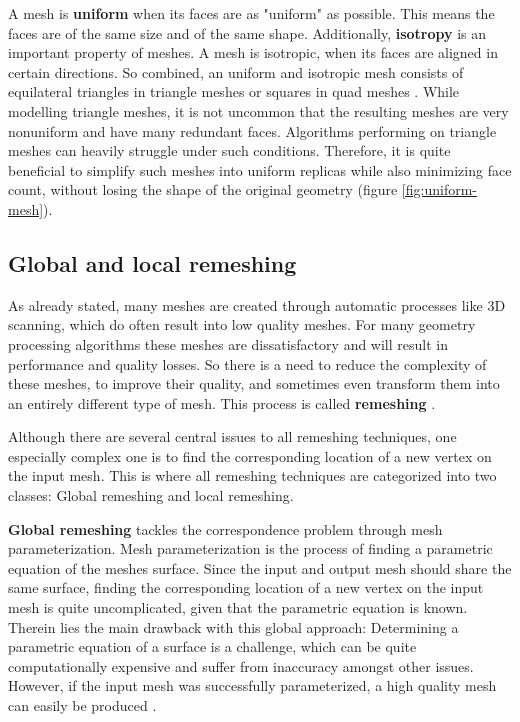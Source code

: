 \documentclass{ACGSeminar}
\begin{document}
A mesh is \textbf{uniform} when its faces are as "uniform" as possible. This means the faces are of the same size and of the same shape. Additionally, \textbf{isotropy} is an important property of meshes. A mesh is isotropic, when its faces are aligned in certain directions. So combined, an uniform and isotropic mesh consists of equilateral triangles in triangle meshes or squares in quad meshes \cite{alliez2003isotropic,surazhsky2003isotropic}. While modelling triangle meshes, it is not uncommon that the resulting meshes are very nonuniform and have many redundant faces. Algorithms performing on triangle meshes can heavily struggle under such conditions. Therefore, it is quite beneficial to simplify such meshes into uniform replicas while also minimizing face count, without losing the shape of the original geometry (figure \ref{fig:uniform-mesh}).


\subsection{Global and local remeshing}
As already stated, many meshes are created through automatic processes like 3D scanning, which do often result into low quality meshes. For many geometry processing algorithms these meshes are dissatisfactory and will result in performance and quality losses. So there is a need to reduce the complexity of these meshes, to improve their quality, and sometimes even transform them into an entirely different type of mesh. This process is called \textbf{remeshing} \cite{alliez2008recent}.\bigskip

Although there are several central issues to all remeshing techniques, one especially complex one is to find the corresponding location of a new vertex on the input mesh. This is where all remeshing techniques are categorized into two classes: Global remeshing and local remeshing.\bigskip

\textbf{Global remeshing} tackles the correspondence problem through mesh parameterization. Mesh parameterization is the process of finding a parametric equation of the meshes surface. Since the input and output mesh should share the same surface, finding the corresponding location of a new vertex on the input mesh is quite uncomplicated, given that the parametric equation is known. Therein lies the main drawback with this global approach: Determining a parametric equation of a surface is a challenge, which can be quite computationally expensive and suffer from inaccuracy amongst other issues. However, if the input mesh was successfully parameterized, a high quality mesh can easily be produced \cite{jakob2015instant,alliez2008recent}.
\end{document}
